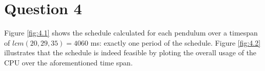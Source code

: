 \section{Question 4}

Figure \ref{fig:4.1} shows the schedule calculated for each pendulum over a
timespan of $lcm(20,29,35) = 4060$ ms: exactly one period of the schedule.
Figure \ref{fig:4.2} illustrates that the schedule is indeed feasible by ploting
the overall usage of the CPU over the aforementioned time span.


\noindent{}
